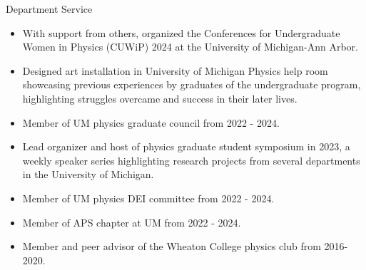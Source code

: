\documentclass{resume} %
\begin{document}
\begin{rSection}{Department Service}
    \begin{itemize}
        \item With support from others, organized the Conferences for Undergraduate Women in Physics (CUWiP) 2024 at the University of Michigan-Ann Arbor.
        \item Designed art installation in University of Michigan Physics help room showcasing previous experiences by graduates of the undergraduate program, highlighting struggles overcame and success in their later lives.
        \item Member of UM physics graduate council from 2022 - 2024. 
        \item Lead organizer and host of physics graduate student symposium in 2023, a weekly speaker series highlighting research projects from several departments in the University of Michigan.
    	\item Member of UM physics DEI committee from 2022 - 2024.
	\item Member of APS chapter at UM from 2022 - 2024.
        \item Member and peer advisor of the Wheaton College physics club from 2016-2020.
    \end{itemize}
\end{rSection}
    \newpage
                

\end{document}
